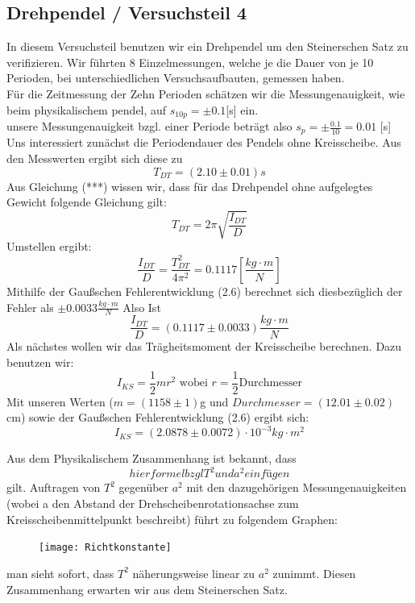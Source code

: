 \documentclass[11pt,a4paper]{article}
\begin{document}
	\subsection{Drehpendel / Versuchsteil 4}
	In diesem Versuchsteil benutzen wir ein Drehpendel um den Steinerschen Satz zu verifizieren.
	Wir führten 8 Einzelmessungen, welche je die  Dauer von je 10 Perioden, bei unterschiedlichen Versuchsaufbauten, gemessen haben.\\
	Für die Zeitmessung der Zehn Perioden schätzen wir die Messungenauigkeit, wie beim physikalischem pendel, auf $s_{10p}=\pm 0.1$[s] ein.\\
	unsere Messungenauigkeit bzgl. einer Periode beträgt also $s_p=\pm \frac{0.1}{10} =0.01$ [s]
	\\
	Uns interessiert zunächst die Periodendauer des Pendels ohne Kreisscheibe. Aus den Messwerten
	ergibt sich diese zu $$T_{DT}=(2.10\pm 0.01)s$$
	Aus Gleichung (***) wissen wir, dass für das Drehpendel ohne aufgelegtes Gewicht folgende Gleichung gilt:
	\begin{equation}
	T_{DT}=2 \pi \sqrt{\frac{I_{DT}}{D}}
	\end{equation}
	Umstellen ergibt:
	\begin{equation}
	\frac{I_{DT}}{D} = \frac{T_{DT}^2}{4 \pi^2}=0.1117[\frac{kg\cdot m}{N}]
	\end{equation}
	Mithilfe der Gaußschen Fehlerentwicklung (2.6) berechnet sich diesbezüglich der Fehler als $\pm 0.0033
	\frac{kg \cdot m}{N}$
	Also Ist $$\frac{I_{DT}}{D} =(0.1117 \pm 0.0033)\frac{kg\cdot m}{N}$$
	Als nächstes wollen wir das Trägheitsmoment der Kreisscheibe berechnen. Dazu benutzen wir:
	\begin{equation}
	I_{KS}=\frac{1}{2}m r^2 \text{  wobei  } r=\frac{1}{2} \text{Durchmesser}
	\end{equation}
	Mit unseren Werten ($m=(1158\pm 1)$g und $Durchmesser=(12.01 \pm 0.02)$cm) sowie der Gaußschen
	Fehlerentwicklung (2.6) ergibt sich:
	\begin{equation}
	I_{KS}=(2.0878 \pm 0.0072)\cdot 10^{-3} kg \cdot m^2
	\end{equation}
	
	
	
	
	
	
	
	
	Aus dem Physikalischem Zusammenhang ist bekannt, dass
	\begin{equation}
	hier formel bzgl T^2 und a^2 einfügen
	\end{equation}
	gilt.
	Auftragen von $T^2$ gegenüber $a^2$ mit den dazugehörigen Messungenauigkeiten (wobei a den Abstand der Drehscheibenrotationsachse zum Kreisscheibenmittelpunkt beschreibt) führt zu folgendem Graphen:\\
	\begin{figure}[H]
	\texttt{[image: Richtkonstante]}\\[1cm] 
	
	\end{figure}
	man sieht sofort, dass $T^2$ näherungsweise linear zu $a^2$ zunimmt. Diesen Zusammenhang erwarten wir aus dem Steinerschen Satz.
	\\
	
\end{document}
